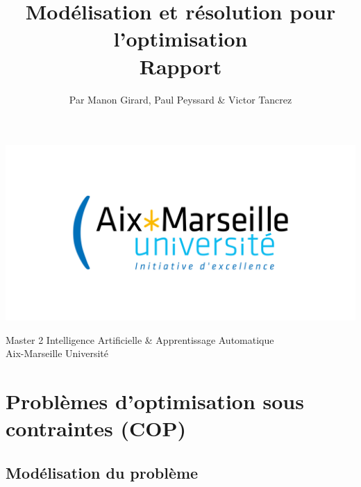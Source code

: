 \documentclass[a4paper, 10pt]{article}
\begin{document}
\setlength{\parindent}{0cm}
\setlength{\parskip}{1ex plus 0.5ex minus 0.2ex}
\newcommand{\hsp}{\hspace{20pt}}
\newcommand{\HRule}{\rule{\linewidth}{0.5mm}}

  \title{Modélisation et résolution pour l'optimisation \\ Rapport \\[1ex] \large }
  \author{Par Manon Girard, Paul Peyssard \& Victor Tancrez}
  \date{}
  \maketitle

  \begin{center}
    \includegraphics[scale=0.2]{images/amu2.png}
  \end{center}

  \vfill
  \begin{center}
    Master 2 Intelligence Artificielle \& Apprentissage Automatique \\
    Aix-Marseille Université \\
  \end{center}
  \pagebreak

  \tableofcontents
  \newpage

  \section{Problèmes d'optimisation sous contraintes (COP)}

    \subsection{Modélisation du problème}
\end{document}
